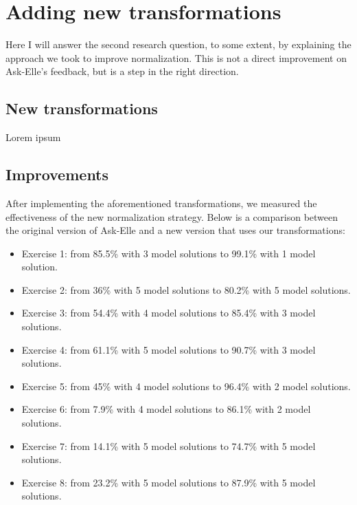 \chapter{Adding new transformations}
\label{sec:improvements}

Here I will answer the second research question, to some extent, by explaining the approach we took to improve normalization. This is not a direct improvement on Ask-Elle's feedback, but is a step in the right direction.

\section{New transformations}

Lorem ipsum





\section{Improvements}

After implementing the aforementioned transformations, we measured the effectiveness of the new normalization strategy. Below is a comparison between the original version of Ask-Elle and a new version that uses our transformations:

\begin{itemize}
    \item Exercise 1: from 85.5\% with 3 model solutions to 99.1\% with 1 model solution.
    \item Exercise 2: from 36\% with 5 model solutions to 80.2\% with 5 model solutions.
    \item Exercise 3: from 54.4\% with 4 model solutions to 85.4\% with 3 model solutions.
    \item Exercise 4: from 61.1\% with 5 model solutions to 90.7\% with 3 model solutions.
    \item Exercise 5: from 45\% with 4 model solutions to 96.4\% with 2 model solutions.
    \item Exercise 6: from 7.9\% with 4 model solutions to 86.1\% with 2 model solutions.
    \item Exercise 7: from 14.1\% with 5 model solutions to 74.7\% with 5 model solutions.
    \item Exercise 8: from 23.2\% with 5 model solutions to 87.9\% with 5 model solutions.
\end{itemize}

